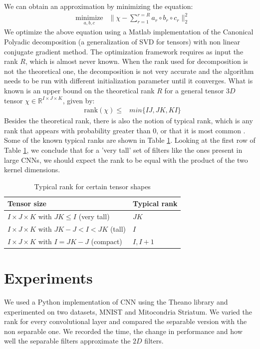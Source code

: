 \documentclass{article} %
\begin{document}
We can obtain an approximation by minimizing the equation:
\begin{equation*}
\begin{aligned}
& \underset{a,b,c}{\text{minimize}}
& \| \chi - \sum_{r=1}^{r=R}{a_{r}\circ b_{r}\circ c_{r}} \|_{2}^{2} 
\end{aligned}
\end{equation*}
We optimize the above equation using a Matlab implementation of the Canonical Polyadic decomposition (a generalization of  SVD for tensors) with  non linear conjugate gradient method. The optimization framework requires as input the rank $R$, which is almost never known. When the rank used for decomposition is not the theoretical one, the decomposition is not very accurate and the algorithm needs to be run with different initialization parameter until it converges.
What is known is an upper bound on the theoretical rank $R$ for a  general tensor $3D$ tensor $\chi \in \mathbb{R}^{I\times J\times K}$, given by:
 \begin{equation*}
\begin{aligned}
& \text{rank}(\chi) \leq 
& min{\{IJ, JK, KI\}}
\end{aligned}
\end{equation*} 
Besides the theoretical rank, there is also the notion of typical rank, which is any rank
that appears with probability greater than 0, or that it is most common \cite{KoBa09}.
Some of the known typical ranks are shown in Table \ref{table:rank}.
Looking at the first row of Table \ref{table:rank}, we conclude that for a 'very tall' set of filters like the ones present in large CNNs, 
we should expect the rank to be equal with the product of the two kernel dimensions.
 \begin{table}
\centering
\begin{tabular}{@{}ll@{}}\toprule
Tensor size & Typical rank \\ \midrule
$I \times J \times K$ with $JK \leq I$ (very tall) & $JK$\\
$I \times J \times K$ with $JK - J < I < JK$ (tall) & $I$ \\
$I \times J \times K$ with $I = JK - J$ (compact) & $I, I+1$  \\ \bottomrule
\end{tabular}
\caption{Typical rank for certain tensor shapes}
\label{table:rank}
\end{table}

\section{Experiments}
We used a Python implementation of CNN using the Theano library and experimented on two datasets, MNIST and Mitocondria Striatum. 
We varied the rank for every convolutional layer and compared the separable version with the non separable one. We recorded the time, the change in performance and how well the separable filters approximate the $2D$ filters. 



\end{document}
